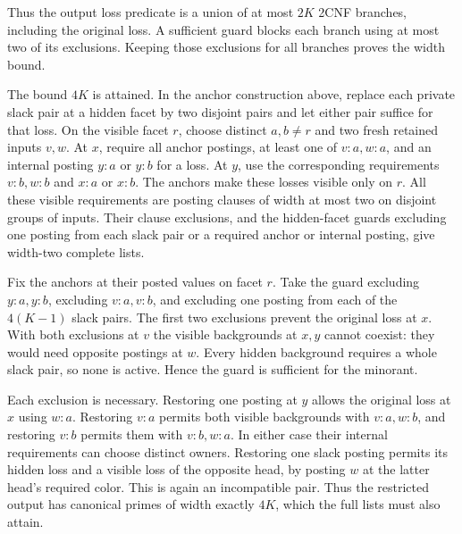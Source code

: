 Thus the output loss predicate is a union of
at most $2K$ 2CNF branches, including the
original loss. A sufficient guard blocks
each branch using at most two of its
exclusions. Keeping those exclusions for
all branches proves the width bound.

The bound $4K$ is attained. In the anchor
construction above, replace each private slack
pair at a hidden facet by two disjoint pairs and
let either pair suffice for that loss. On the
visible facet $r$, choose distinct $a,b\ne r$
and two fresh retained inputs $v,w$. At $x$,
require all anchor postings, at least one of
$v:a,w:a$, and an internal posting $y:a$ or
$y:b$ for a loss. At $y$, use the corresponding
requirements $v:b,w:b$ and $x:a$ or $x:b$.
The anchors make these losses visible only
on $r$. All these visible requirements are
posting clauses of width at most two on
disjoint groups of inputs. Their clause
exclusions, and the hidden-facet guards
excluding one posting from each slack pair
or a required anchor or internal posting,
give width-two complete lists.

Fix the anchors at their posted values on
facet $r$. Take the guard excluding $y:a,y:b$,
excluding $v:a,v:b$, and excluding one posting
from each of the $4(K-1)$ slack pairs.
The first two exclusions prevent the original
loss at $x$. With both exclusions at $v$ the
visible backgrounds at $x,y$ cannot coexist:
they would need opposite postings at $w$.
Every hidden background requires a whole
slack pair, so none is active. Hence the
guard is sufficient for the minorant.

Each exclusion is necessary. Restoring one
posting at $y$ allows the original loss at
$x$ using $w:a$. Restoring $v:a$ permits
both visible backgrounds with $v:a,w:b$,
and restoring $v:b$ permits them with
$v:b,w:a$. In either case their internal
requirements can choose distinct owners.
Restoring one slack posting permits its
hidden loss and a visible loss of the
opposite head, by posting $w$ at the latter
head's required color. This is again an
incompatible pair. Thus the restricted
output has canonical primes of width
exactly $4K$, which the full lists must
also attain.

